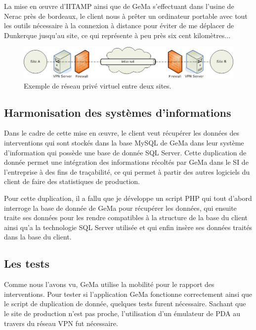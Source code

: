 La mise en \oe{}uvre d'IITAMP ainsi que de GeMa s'effectuant dans
l'usine de Nerac près de bordeaux, le client nous à prêter un ordinateur
portable avec tout les outils nécessaire à la connexion à distance pour
éviter de me déplacer de Dunkerque jusqu'au site, ce qui représente à
peu près six cent kilomètres...

\begin{figure}
  \begin{center}
    \includegraphics[scale=0.5]{images/vpn.png}
    \caption{Exemple de réseau privé virtuel entre deux sites.}
    \label{vpn}
  \end{center}
\end{figure}

\subsection{Harmonisation des systèmes d'informations} %
\label{sub:Harmonisation des systèmes d'informations}

Dans le cadre de cette mise en \oe{}uvre, le client veut récupérer les
données des interventions qui sont stockés dans la base MySQL de GeMa
dans leur système d'information qui possède une base de donnée SQL
Server. Cette duplication de donnée permet une intégration des
informations récoltés par GeMa dans le SI de l'entreprise à des fins de
traçabilité, ce qui permet à partir des autres logiciels du client de
faire des statistiques de production.

Pour cette duplication, il a fallu que je développe un script PHP qui
tout d'abord interroge la base de donnée de GeMa pour récupérer les
données, qui ensuite traite ses données pour les rendre compatibles à la
structure de la base du client ainsi qu'a la technologie SQL Server
utilisée et qui enfin insère ses données traités dans la base du client.

\subsection{Les tests} %
\label{sub:Les tests}

Comme nous l'avons vu, GeMa utilise la mobilité pour le rapport des
interventions. Pour tester si l'application GeMa fonctionne correctement
ainsi que le script de duplication de donnée, quelques tests furent
nécessaire. Sachant que le site de production n'est pas proche,
l'utilisation d'un émulateur de PDA au travers du réseau VPN fut
nécessaire.

